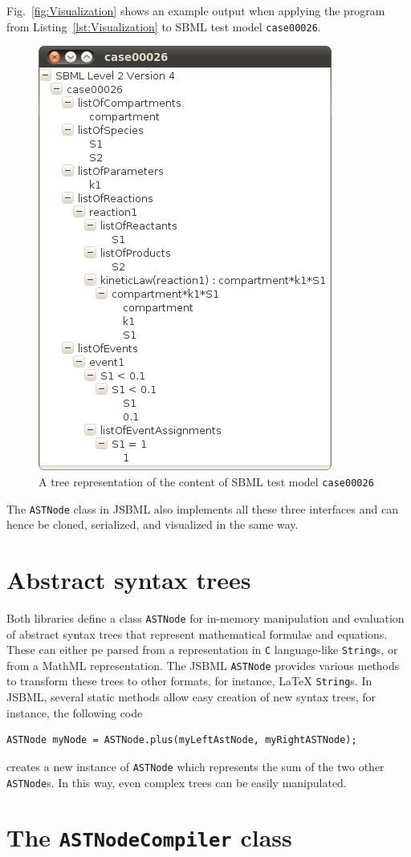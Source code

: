 \documentclass[
  letterpaper,
  11pt,
  headsepline,
  pointlessnumbers,
  tablecaptionabove,
  headinclude,
  appendixprefix,
  idxtotoc,
  bibtotoc
]{scrartcl}
\begin{document}
Fig.~\vref{fig:Visualization} shows an example output when applying the program from 
Listing~\vref{lst:Visualization} to SBML test model \texttt{case00026}.
\begin{figure}
\includegraphics[width=.35\textwidth]{posters/2010_ICSB_and_COMBINE/JSBMLvisualizerTransparent}
\caption[Tree representatation of an SBML file]{A tree representation of the content of SBML test model \texttt{case00026}}
\label{fig:Visualization}
\end{figure}
The \verb!ASTNode! class in JSBML also implements all these three interfaces and can hence
be cloned, serialized, and visualized in the same way.


\section{Abstract syntax trees}

Both libraries define a class \verb!ASTNode! for in-memory manipulation and evaluation
of abstract syntax trees that represent mathematical formulae and equations. These
can either pe parsed from a representation in \verb!C! language-like \verb!String!s,
or from a MathML representation. The JSBML \verb!ASTNode! provides various methods
to transform these trees to other formats, for instance, \LaTeX{} \verb!String!s.
In JSBML, several static methods allow easy creation of new syntax trees, for instance,
the following code
\begin{verbatim}
ASTNode myNode = ASTNode.plus(myLeftAstNode, myRightASTNode);
\end{verbatim}
creates a new instance of \verb!ASTNode! which represents the sum of the two other
\verb!ASTNode!s. In this way, even complex trees can be easily manipulated.

\section{The \texttt{ASTNodeCompiler} class}
\end{document}
